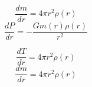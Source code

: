 \begin{equation}
    \frac{dm}{dr} = 4\pi r^2 \rho(r)
\end{equation}
\begin{equation}
    \frac{dP}{dr} = -\frac{G m(r)\rho(r)}{r^2}
\end{equation}

\begin{equation}
    \frac{dT}{dr} = 4\pi r^2 \rho(r)
\end{equation}
\begin{equation}
    \frac{dm}{dr} = 4\pi r^2 \rho(r)
\end{equation}